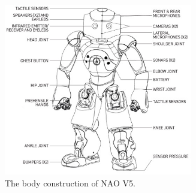 \begin{figure}
	\centering
	\includegraphics[height=75mm]{figures/content/nao-body.jpg} 
	\caption{The body construction of NAO V5. \cite{8}} \label{fg:nao:body} 
\end{figure}
